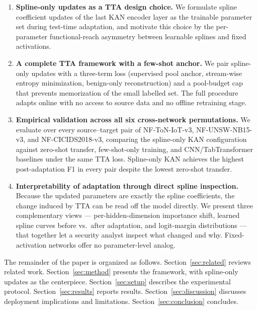 \documentclass[10pt, conference, letterpaper]{IEEEtran}
\begin{document}
\begin{enumerate}
    \item \textbf{Spline-only updates as a TTA design choice.} We formulate spline coefficient updates of the last KAN encoder layer as the trainable parameter set during test-time adaptation, and motivate this choice by the per-parameter functional-reach asymmetry between learnable splines and fixed activations.

    \item \textbf{A complete TTA framework with a few-shot anchor.} We pair spline-only updates with a three-term loss (supervised pool anchor, stream-wise entropy minimization, benign-only reconstruction) and a pool-budget cap that prevents memorization of the small labelled set. The full procedure adapts online with no access to source data and no offline retraining stage.

    \item \textbf{Empirical validation across all six cross-network permutations.} We evaluate over every source--target pair of NF-ToN-IoT-v3, NF-UNSW-NB15-v3, and NF-CICIDS2018-v3, comparing the spline-only KAN configuration against zero-shot transfer, few-shot-only training, and CNN/TabTransformer baselines under the same TTA loss. Spline-only KAN achieves the highest post-adaptation F1 in every pair despite the lowest zero-shot transfer.

    \item \textbf{Interpretability of adaptation through direct spline inspection.} Because the updated parameters are exactly the spline coefficients, the change induced by TTA can be read off the model directly. We present three complementary views --- per-hidden-dimension importance shift, learned spline curves before vs.\ after adaptation, and logit-margin distributions --- that together let a security analyst inspect what changed and why. Fixed-activation networks offer no parameter-level analog.
\end{enumerate}

The remainder of the paper is organized as follows. Section~\ref{sec:related} reviews related work. Section~\ref{sec:method} presents the framework, with spline-only updates as the centerpiece. Section~\ref{sec:setup} describes the experimental protocol. Section~\ref{sec:results} reports results. Section~\ref{sec:discussion} discusses deployment implications and limitations. Section~\ref{sec:conclusion} concludes.


\end{document}
